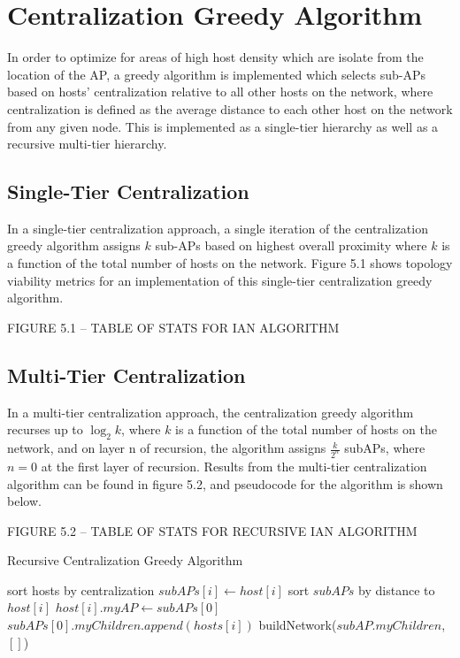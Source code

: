 \documentclass{sigcomm-alternate}
\begin{document}
\section{Centralization Greedy Algorithm}
In order to optimize for areas of high host density which are isolate from the location of the AP, a greedy algorithm is implemented which selects sub-APs based on hosts' centralization relative to all other hosts on the network, where centralization is defined as the average distance to each other host on the network from any given node. This is implemented as a single-tier hierarchy as well as a recursive multi-tier hierarchy.

\subsection{Single-Tier Centralization}
In a single-tier centralization approach, a single iteration of the centralization greedy algorithm assigns $k$ sub-APs based on highest overall proximity where $k$ is a function of the total number of hosts on the network. Figure 5.1 shows topology viability metrics for an implementation of this single-tier centralization greedy algorithm.

FIGURE 5.1 -- TABLE OF STATS FOR IAN ALGORITHM

\subsection{Multi-Tier Centralization}
In a multi-tier centralization approach, the centralization greedy algorithm recurses up to $\log_2 k$, where $k$ is a function of the total number of hosts on the network, and on layer n of recursion, the algorithm assigns $\frac{k}{2^n}$ subAPs, where $n = 0$ at the first layer of recursion. Results from the multi-tier centralization algorithm can be found in figure 5.2, and pseudocode for the algorithm is shown below.

FIGURE 5.2 -- TABLE OF STATS FOR RECURSIVE IAN ALGORITHM

\begin{algorithm}[H]
\caption{Recursive Centralization Greedy Algorithm}
\begin{algorithmic}[H]
\State sort hosts by centralization
\State $subAPs[i]\gets host[i]$
\EndFor
{}
\State sort $subAPs$ by distance to $host[i]$
\State $host[i].myAP \gets subAPs[0]$
\State $subAPs[0].myChildren.append(hosts[i])$
\EndFor
{}
\State buildNetwork($subAP.myChildren$, $[]$)
\EndFor
\EndProcedure
\end{algorithmic}
\end{algorithm}
\end{document}
